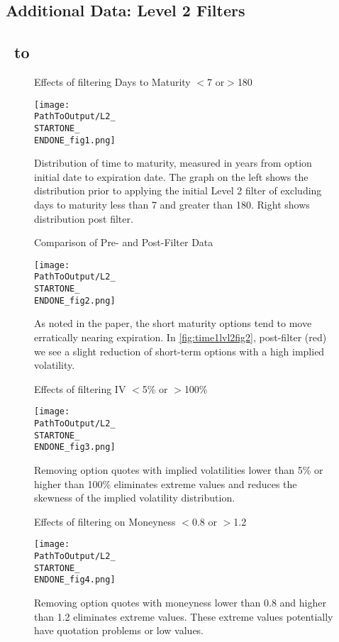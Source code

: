 \begin{appendix}
\section{Additional Data: Level 2 Filters}\label{app:lvl2}
\subsection{\STARTONE\ to \ENDONE }

\begin{figure}[H] %
  \centering
  \caption{Effects of filtering Days to Maturity $<$7 or$ >$180}
  \texttt{[image: \\PathToOutput/L2\_\\STARTONE\_\\ENDONE\_fig1.png]}
  \caption*{Distribution of time to maturity, measured in years from option initial date to expiration date. The graph on the left shows the distribution prior to applying the initial Level 2 filter of excluding days to maturity less than 7 and greater than 180. Right shows distribution post filter.}
\label{fig:time1lvl2fig1}
\end{figure}

\begin{figure}[H] %
  \centering
  \caption{Comparison of Pre- and Post-Filter Data}
  \texttt{[image: \\PathToOutput/L2\_\\STARTONE\_\\ENDONE\_fig2.png]}
  \caption*{As noted in the paper, the short maturity options tend to move erratically nearing expiration. In \autoref{fig:time1lvl2fig2}, post-filter (red) we see a slight reduction of short-term options with a high implied volatility.}
\label{fig:time1lvl2fig2}
\end{figure}

\begin{figure}[H] %
  \centering
  \caption{Effects of filtering IV $<$5\% or $>$100\%}
  \texttt{[image: \\PathToOutput/L2\_\\STARTONE\_\\ENDONE\_fig3.png]}
  \caption*{Removing option quotes with implied volatilities lower than 5\% or higher than 100\% eliminates extreme values and reduces the skewness of the implied volatility distribution.}
\label{fig:time1lvl2fig3}
\end{figure}


\begin{figure}[H] %
  \centering
  \caption{Effects of filtering on Moneyness $<$0.8 or $>$1.2}
  \texttt{[image: \\PathToOutput/L2\_\\STARTONE\_\\ENDONE\_fig4.png]}
  \caption*{Removing option quotes with moneyness lower than 0.8 and higher than 1.2 eliminates extreme values. These extreme values potentially have quotation problems or low values.}
  \label{fig:time1lvl2fig4}
\end{figure}



\end{appendix}
